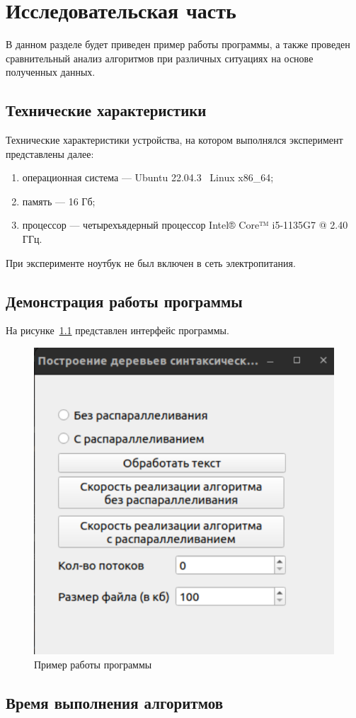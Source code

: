 \chapter{Исследовательская часть}

В данном разделе будет приведен пример работы программы, а также проведен сравнительный анализ алгоритмов при различных ситуациях на основе полученных данных.

\section{Технические характеристики}

Технические характеристики устройства, на котором выполнялся эксперимент представлены далее:

\begin{enumerate}[label=\arabic*)]
	\item операционная система --- Ubuntu 22.04.3~\cite{ubuntu} Linux x86\_64;
	\item память --- 16 Гб;
	\item процессор --- четырехъядерный процессор Intel® Core™ i5-1135G7 @ 2.40 ГГц.
\end{enumerate}

При эксперименте ноутбук не был включен в сеть электропитания.

\section{Демонстрация работы программы}

На рисунке~\ref{fig:example} представлен интерфейс программы.

\begin{figure}[h!]
	\centering
	\includegraphics[width=0.4\linewidth]{img/example}
	\caption{Пример работы программы}
	\label{fig:example}
\end{figure}

\section{Время выполнения алгоритмов}

